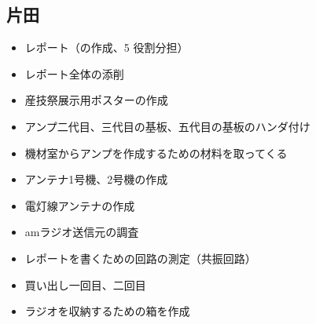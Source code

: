 \documentclass[report.tex]{subfiles}
\begin{document}
\subsection{片田}

\begin{itemize}
	\item レポート（の作成、5 役割分担）
	\item レポート全体の添削
	\item 産技祭展示用ポスターの作成
	\item アンプ二代目、三代目の基板、五代目の基板のハンダ付け
	\item 機材室からアンプを作成するための材料を取ってくる
	\item アンテナ1号機、2号機の作成
	\item 電灯線アンテナの作成
	\item amラジオ送信元の調査
	\item レポートを書くための回路の測定（共振回路）
	\item 買い出し一回目、二回目
	\item ラジオを収納するための箱を作成
\end{itemize}
\end{document}
